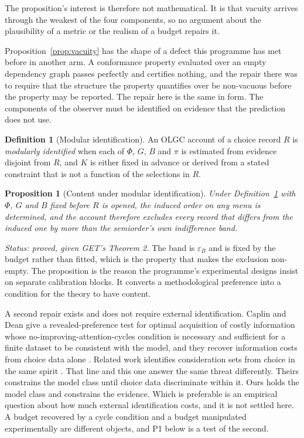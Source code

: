 \documentclass[11pt,letterpaper]{article}
\theoremstyle{plain}
\newtheorem{proposition}[theorem]{Proposition}
\theoremstyle{definition}
\newtheorem{definition}[theorem]{Definition}
\begin{document}
The proposition's interest is therefore not mathematical. It is that vacuity
arrives through the weakest of the four components, so no argument about the
plausibility of a metric or the realism of a budget repairs it.

Proposition~\ref{prop:vacuity} has the shape of a defect this programme has met
before in another arm. A conformance property evaluated over an empty dependency
graph passes perfectly and certifies nothing, and the repair there was to
require that the structure the property quantifies over be non-vacuous before
the property may be reported. The repair here is the same in form. The
components of the observer must be identified on evidence that the prediction
does not use.

\begin{definition}[Modular identification]
\label{def:modular}
An OLGC account of a choice record $R$ is \emph{modularly identified} when each
of $\Phi$, $G$, $B$ and $\pi$ is estimated from evidence disjoint from $R$, and
$K$ is either fixed in advance or derived from a stated constraint that is not a
function of the selections in $R$.
\end{definition}

\begin{proposition}[Content under modular identification]
\label{prop:content}
Under Definition~\ref{def:modular} with $\Phi$, $G$ and $B$ fixed before $R$ is
opened, the induced order on any menu is determined, and the account therefore
excludes every record that differs from the induced one by more than the
semiorder's own indifference band.
\end{proposition}

\noindent\emph{Status: proved, given GET's Theorem 2.} The band is $\varepsilon_B$
and is fixed by the budget rather than fitted, which is the property that makes
the exclusion non-empty. The proposition is the reason the programme's
experimental designs insist on separate calibration blocks. It converts a
methodological preference into a condition for the theory to have content.

A second repair exists and does not require external identification. Caplin and
Dean give a revealed-preference test for optimal acquisition of costly
information whose no-improving-attention-cycles condition is necessary and
sufficient for a finite dataset to be consistent with the model, and they
recover information costs from choice data alone \cite{caplindean2015}. Related
work identifies consideration sets from choice in the same spirit
\cite{masatlioglu2012,manzini2007}. That line and this one answer the same
threat differently. Theirs constrains the model class until choice data
discriminate within it. Ours holds the model class and constrains the evidence.
Which is preferable is an empirical question about how much external
identification costs, and it is not settled here. A budget recovered by a
cycle condition and a budget manipulated experimentally are different objects,
and P1 below is a test of the second.
\end{document}
